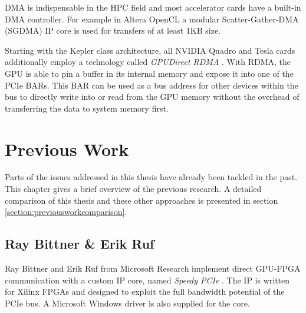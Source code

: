 DMA is indispensable in the HPC field and most accelerator cards have a built-in DMA controller.
For example in Altera OpenCL a modular Scatter-Gather-DMA (SGDMA) IP core \cite{altera_ip} is used for transfers of at least 1KB size.

Starting with the Kepler class architecture, all NVIDIA Quadro and Tesla cards additionally employ a technology called \emph{GPUDirect RDMA} \cite{rdma}.
With RDMA, the GPU is able to pin a buffer in its internal memory and expose it into one of the PCIe BARs.
This BAR can be used as a bus address for other devices within the bus to directly write into or read from the GPU memory without the overhead of transferring the data to system memory first.


























\chapter{Previous Work}
\label{section:previouswork}


Parts of the issues addressed in this thesis have already been tackled in the past.
This chapter gives a brief overview of the previous research.
A detailed comparison of this thesis and these other approaches is presented in section \ref{section:previousworkcomparison}.



\section{Ray Bittner \& Erik Ruf}
\label{bittner}

Ray Bittner and Erik Ruf from Microsoft Research implement direct GPU-FPGA communication with a custom IP core, named \emph{Speedy PCIe} \cite{bittner,bittner_speedy}.
The IP is written for Xilinx FPGAs and designed to exploit the full bandwidth potential of the PCIe bus.
A Microsoft Windows driver is also supplied for the core.

